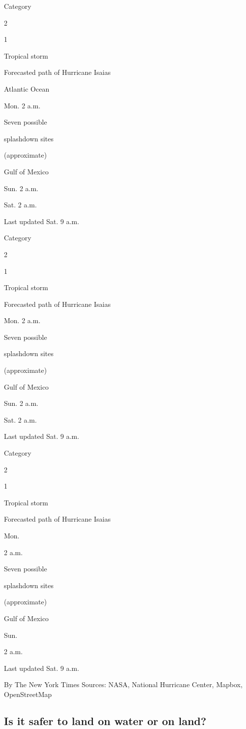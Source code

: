 Category

2

1

Tropical storm

Forecasted path of Hurricane Isaias

Atlantic Ocean

Mon. 2 a.m.

Seven possible

splashdown sites

(approximate)

Gulf of Mexico

Sun. 2 a.m.

Sat. 2 a.m.

Last updated Sat. 9 a.m.

Category

2

1

Tropical storm

Forecasted path of Hurricane Isaias

Mon. 2 a.m.

Seven possible

splashdown sites

(approximate)

Gulf of Mexico

Sun. 2 a.m.

Sat. 2 a.m.

Last updated Sat. 9 a.m.

Category

2

1

Tropical storm

Forecasted path of Hurricane Isaias

Mon.

2 a.m.

Seven possible

splashdown sites

(approximate)

Gulf of Mexico

Sun.

2 a.m.

Last updated Sat. 9 a.m.

By The New York Times \textbar{} Sources: NASA, National Hurricane
Center, Mapbox, OpenStreetMap

\hypertarget{is-it-safer-to-land-on-water-or-on-land}{%
\subsection{Is it safer to land on water or on
land?}\label{is-it-safer-to-land-on-water-or-on-land}}

